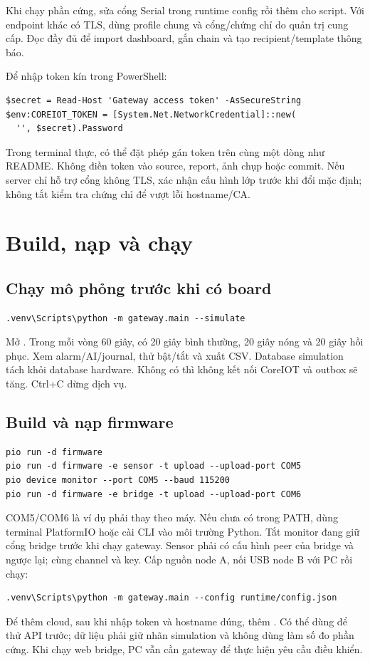Khi chạy phần cứng, sửa cổng Serial trong runtime config rồi thêm  cho script. Với endpoint khác có TLS, dùng profile chung  và cổng/chứng chỉ do quản trị cung cấp. Đọc đầy đủ  để import dashboard, gắn chain và tạo recipient/template thông báo.

Để nhập token kín trong PowerShell:
\begin{verbatim}
$secret = Read-Host 'Gateway access token' -AsSecureString
$env:COREIOT_TOKEN = [System.Net.NetworkCredential]::new(
  '', $secret).Password
\end{verbatim}
Trong terminal thực, có thể đặt phép gán token trên cùng một dòng như README. Không điền token vào source, report, ảnh chụp hoặc commit. Nếu server chỉ hỗ trợ cổng không TLS, xác nhận cấu hình lớp trước khi đổi mặc định; không tắt kiểm tra chứng chỉ để vượt lỗi hostname/CA.

\section{Build, nạp và chạy}
\subsection{Chạy mô phỏng trước khi có board}
\begin{verbatim}
.venv\Scripts\python -m gateway.main --simulate
\end{verbatim}
Mở . Trong mỗi vòng 60 giây, có 20 giây bình thường, 20 giây nóng và 20 giây hồi phục. Xem alarm/AI/journal, thử bật/tắt và xuất CSV. Database simulation tách khỏi database hardware. Không có  thì không kết nối CoreIOT và outbox sẽ tăng. Ctrl+C dừng dịch vụ.

\subsection{Build và nạp firmware}
\begin{verbatim}
pio run -d firmware
pio run -d firmware -e sensor -t upload --upload-port COM5
pio device monitor --port COM5 --baud 115200
pio run -d firmware -e bridge -t upload --upload-port COM6
\end{verbatim}
COM5/COM6 là ví dụ phải thay theo máy. Nếu  chưa có trong PATH, dùng terminal PlatformIO hoặc cài CLI vào môi trường Python. Tắt monitor đang giữ cổng bridge trước khi chạy gateway. Sensor phải có cấu hình peer của bridge và ngược lại; cùng channel và key. Cấp nguồn node A, nối USB node B với PC rồi chạy:
\begin{verbatim}
.venv\Scripts\python -m gateway.main --config runtime/config.json
\end{verbatim}
Để thêm cloud, sau khi nhập token và hostname đúng, thêm . Có thể dùng  để thử API trước; dữ liệu phải giữ nhãn simulation và không dùng làm số đo phần cứng. Khi chạy web bridge, PC vẫn cần gateway để thực hiện yêu cầu điều khiển.


